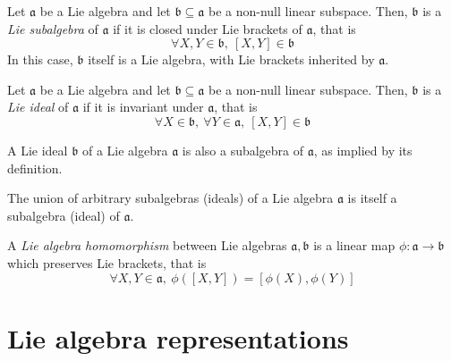 \begin{definition}
    Let $\mathfrak{a}$ be a Lie algebra and let $\mathfrak{b} \subseteq \mathfrak{a}$ be a non-null linear subspace.
    Then, $\mathfrak{b}$ is a \emph{Lie subalgebra} of $\mathfrak{a}$ if it is closed under Lie brackets of $\mathfrak{a}$, that is
    \begin{equation*}
        \forall X, Y \in \mathfrak{b},\ [X,Y] \in \mathfrak{b}
    \end{equation*}
    In this case, $\mathfrak{b}$ itself is a Lie algebra, with Lie brackets inherited by $\mathfrak{a}$.
\end{definition}

\begin{definition}
    Let $\mathfrak{a}$ be a Lie algebra and let $\mathfrak{b} \subseteq \mathfrak{a}$ be a non-null linear subspace.
    Then, $\mathfrak{b}$ is a \emph{Lie ideal} of $\mathfrak{a}$ if it is invariant under $\mathfrak{a}$, that is
    \begin{equation*}
        \forall X \in \mathfrak{b},\ \forall Y \in \mathfrak{a},\ [X, Y] \in \mathfrak{b}
    \end{equation*}
\end{definition}
\begin{proposition}
    A Lie ideal $\mathfrak{b}$ of a Lie algebra $\mathfrak{a}$ is also a subalgebra of $\mathfrak{a}$, as implied by its definition.
\end{proposition}

\begin{proposition}
    The union of arbitrary subalgebras (ideals) of a Lie algebra $\mathfrak{a}$ is itself a subalgebra (ideal) of $\mathfrak{a}$.
\end{proposition}

\begin{definition}\label{def:lie_homomorphism}
    A \emph{Lie algebra homomorphism} between Lie algebras $\mathfrak{a}, \mathfrak{b}$ is a linear map $\phi: \mathfrak{a} \rightarrow \mathfrak{b}$ which preserves Lie brackets, that is
    \begin{equation*}
        \forall X, Y \in \mathfrak{a},\ \phi([X,Y]) = [\phi(X), \phi(Y)]
    \end{equation*}
\end{definition}





\section{Lie algebra representations}

